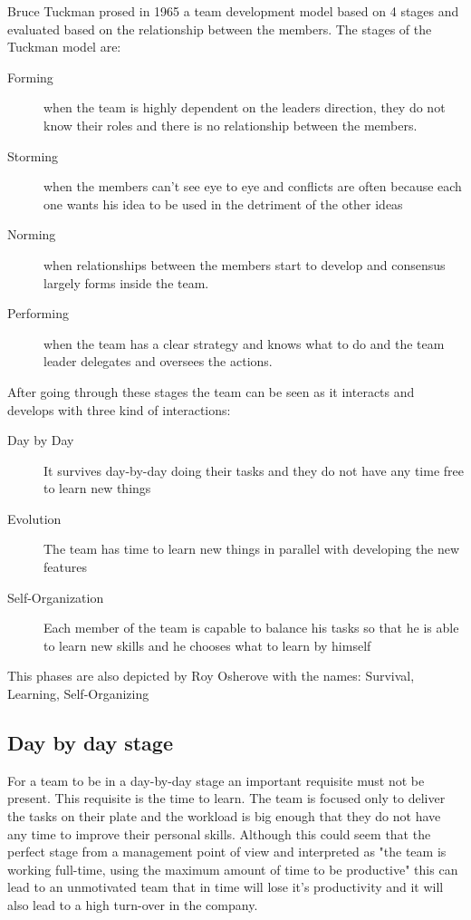 
Bruce Tuckman prosed in 1965 a team development model based on 4 stages and evaluated based on the relationship between the members. The stages of the Tuckman model are:
\begin{description}
\item[Forming] when the team is highly dependent on the leaders direction, they do not know their roles and there is no relationship between the members.
\item[Storming] when the members can't see eye to eye and conflicts are often because each one wants his idea to be used in the detriment of the other ideas
\item[Norming] when relationships between the members start to develop and consensus largely forms inside the team.
\item[Performing] when the team has a clear strategy and knows what to do and the team leader delegates and oversees the actions.
\end{description}

After going through these stages the team can be seen as it interacts and develops with three kind of interactions:
\begin{description}
\item [Day by Day] It survives day-by-day doing their tasks and they do not have any time free to learn new things
\item [Evolution] The team has time to learn new things in parallel with developing the new features
\item [Self-Organization] Each member of the team is capable to balance his tasks so that he is able to learn new skills and he chooses what to learn by himself
\end{description}

This phases are also depicted by Roy Osherove \cite{notes-to-a-software-team-leader} with the names: Survival, Learning, Self-Organizing

\subsection{Day by day stage}
For a team to be in a day-by-day stage an important requisite must not be present. This requisite is the time to learn. The team is focused only to deliver the tasks on their plate and the workload is big enough that they do not have any time to improve their personal skills. Although this could seem that the perfect stage from a management point of view and interpreted as "the team is working full-time, using the maximum amount of time to be productive" this can lead to an unmotivated team that in time will lose it's productivity and it will also lead to a high turn-over in the company. 

